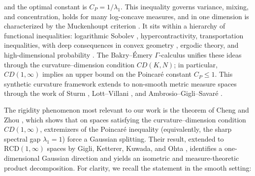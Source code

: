 \documentclass[10pt,a4paper,reqno]{amsart}
\begin{document}
and the optimal constant is $C_P=1/\lambda_1$.  This inequality governs variance, mixing, and concentration, holds for many log-concave measures, and in one dimension is characterized by the Muckenhoupt criterion \cite{Mac}.  It sits within a hierarchy of functional inequalities: logarithmic Sobolev \cite{Gross}, hypercontractivity, transportation inequalities, with deep consequences in convex geometry \cite{BobkovLedoux,KLS}, ergodic theory, and high-dimensional probability \cite{Milman}.  The Bakry--Émery $\Gamma$-calculus \cite{be} unifies these ideas through the curvature--dimension condition $CD(K,N)$; in particular, $CD(1,\infty)$ implies an upper bound on the Poincaré constant $C_P\le 1$.  This synthetic curvature framework extends to non-smooth metric measure spaces through the work of Sturm \cite{SturmI,SturmII}, Lott--Villani \cite{LottVillani}, and Ambrosio--Gigli--Savaré \cite{AGS}.
\par\vspace{0.5em}
The rigidity phenomenon most relevant to our work is the theorem of Cheng and Zhou \cite{ChengZhou}, which shows that on spaces satisfying the curvature–dimension condition $CD(1,\infty)$, extremizers of the Poincaré inequality (equivalently, the sharp spectral gap $\lambda_1=1$) force a Gaussian splitting. Their result, extended to $\mathrm{RCD}(1,\infty)$ spaces by Gigli, Ketterer, Kuwada, and Ohta \cite{GKKO,KuwadaOhta}, identifies a one-dimensional Gaussian direction and yields an isometric and measure-theoretic product decomposition. For clarity, we recall the statement in the smooth setting:
\end{document}
